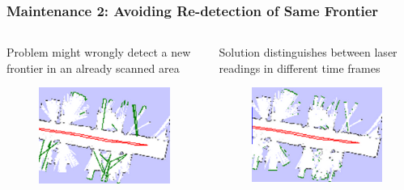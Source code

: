 \begin{frame} 
\frametitle{Maintenance 2: Avoiding Re-detection of Same Frontier}

\begin{columns}
\begin{column}{0.5\textwidth}
	\begin{alertblock}{Problem}
	\FFD might wrongly detect a new frontier in an already scanned area
	\end{alertblock} 
	\begin{figure}
		 \centering
		 \includegraphics[width=0.7\columnwidth,keepaspectratio]{images/redetecting_bad_example}
	\end{figure}
\end{column}
\begin{column}{0.5\textwidth}
	\begin{block}{Solution}
	\FFD distinguishes between laser readings in different time frames
	\end{block} 
	\begin{figure}
		 \centering 
		 \includegraphics[width=0.7\columnwidth,keepaspectratio,trim = 4pt 0 0 0,
		 clip]{images/redetecting_good_example}
		\end{figure}
	\end{column}
\end{columns}

\end{frame}



